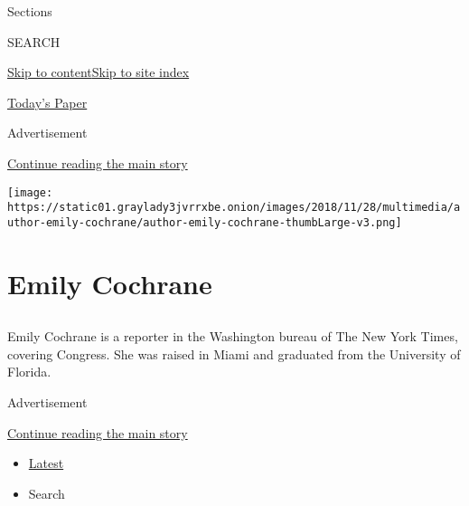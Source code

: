 Sections

SEARCH

\protect\hyperlink{site-content}{Skip to
content}\protect\hyperlink{site-index}{Skip to site index}

\href{https://myaccount.nytimes3xbfgragh.onion/auth/login?response_type=cookie\&client_id=vi}{}

\href{https://www.nytimes3xbfgragh.onion/section/todayspaper}{Today's
Paper}

Advertisement

\protect\hyperlink{after-top}{Continue reading the main story}

\texttt{[image: https://static01.graylady3jvrrxbe.onion/images/2018/11/28/multimedia/author-emily-cochrane/author-emily-cochrane-thumbLarge-v3.png]}

\hypertarget{emily-cochrane}{%
\section{Emily Cochrane}\label{emily-cochrane}}

\subsection{}

Emily Cochrane is a reporter in the Washington bureau of The New York
Times, covering Congress. She was raised in Miami and graduated from the
University of Florida.

Advertisement

\protect\hyperlink{after-mid1}{Continue reading the main story}

\begin{itemize}
\tightlist
\item
  \protect\hyperlink{stream-panel}{Latest}
\item
  Search
\end{itemize}

